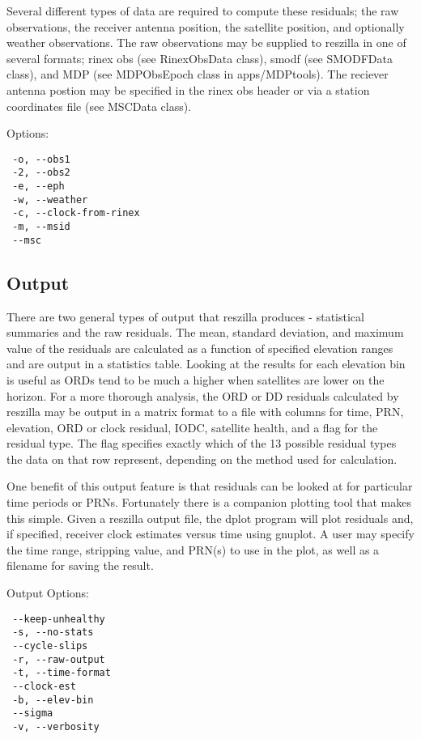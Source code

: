 Several different types of data are required to compute these
residuals; the raw observations, the receiver antenna position, the
satellite position, and optionally  weather observations. The raw
observations may be supplied to reszilla in one of several formats;
rinex obs (see RinexObsData class), smodf (see SMODFData class), and
MDP (see MDPObsEpoch class in apps/MDPtools). The reciever antenna
postion may be specified in the rinex obs header or via a station
coordinates file (see MSCData class).

Options:

\begin{verbatim}
 -o, --obs1
 -2, --obs2
 -e, --eph
 -w, --weather
 -c, --clock-from-rinex
 -m, --msid
 --msc
\end{verbatim}

\subsection{Output}
There are two general types of output that reszilla produces -
statistical summaries and the raw residuals.  The mean, standard 
deviation, and maximum value of the residuals are calculated 
as a function of specified elevation ranges and are output in a 
statistics table. Looking at the results for each elevation bin 
is useful as ORDs tend to be much a higher when satellites are 
lower on the horizon. For a more thorough analysis, the ORD or DD 
residuals calculated by reszilla may be output in a matrix format 
to a file with columns for time, PRN, elevation, ORD or clock residual, 
IODC, satellite health, and a flag for the residual type.  The flag 
specifies exactly which of the 13 possible residual types the data 
on that row represent, depending on the method used for calculation. 

One benefit of this output feature is that residuals can be looked at 
for particular time periods or PRNs. Fortunately there is a companion 
plotting tool that makes this simple. Given a reszilla output file, 
the dplot program will plot residuals and, if specified, receiver clock 
estimates versus time using gnuplot. A user may specify the time 
range, stripping value, and PRN(s) to use in the plot, as well as a
filename for saving the result. 

Output Options:

\begin{verbatim}
 --keep-unhealthy
 -s, --no-stats
 --cycle-slips
 -r, --raw-output
 -t, --time-format
 --clock-est
 -b, --elev-bin
 --sigma
 -v, --verbosity
\end{verbatim}

